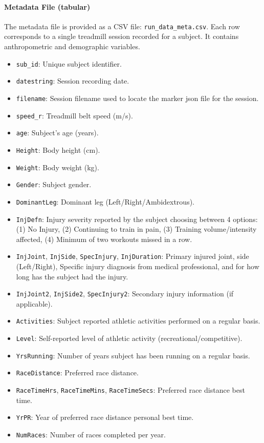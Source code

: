 \paragraph{Metadata File (tabular)} The metadata file is provided as a CSV file: \texttt{run\_data\_meta.csv}. Each row corresponds to a single treadmill session recorded for a subject. It contains anthropometric and demographic variables.
\begin{itemize}
    \item \texttt{sub\_id}: Unique subject identifier.
    \item \texttt{datestring}: Session recording date.
    \item \texttt{filename}: Session filename used to locate the marker json file for the session.
    \item \texttt{speed\_r}: Treadmill belt speed (m/s).
    \item \texttt{age}: Subject's age (years).
    \item \texttt{Height}: Body height (cm).
    \item \texttt{Weight}: Body weight (kg).
    \item \texttt{Gender}: Subject gender.
    \item \texttt{DominantLeg}: Dominant leg (Left/Right/Ambidextrous).
    \item \texttt{InjDefn}: Injury severity reported by the subject choosing between 4 options: (1) No Injury, (2) Continuing to train in pain, (3) Training volume/intensity affected, (4) Minimum of two workouts missed in a row.
    \item \texttt{InjJoint}, \texttt{InjSide}, \texttt{SpecInjury}, \texttt{InjDuration}: Primary injured joint, side (Left/Right), Specific injury diagnosis from medical professional, and for how long has the subject had the injury.
    \item \texttt{InjJoint2}, \texttt{InjSide2}, \texttt{SpecInjury2}: Secondary injury information (if applicable).
    \item \texttt{Activities}: Subject reported athletic activities performed on a regular basis.
    \item \texttt{Level}: Self-reported level of athletic activity (recreational/competitive).
    \item \texttt{YrsRunning}: Number of years subject has been running on a regular basis.
    \item \texttt{RaceDistance}: Preferred race distance.
    \item \texttt{RaceTimeHrs}, \texttt{RaceTimeMins}, \texttt{RaceTimeSecs}: Preferred race distance best time.
    \item \texttt{YrPR}: Year of preferred race distance personal best time.
    \item \texttt{NumRaces}: Number of races completed per year.
\end{itemize}

